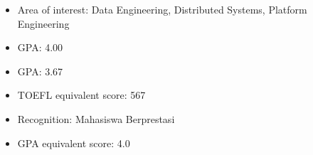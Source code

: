\begin{itemize}
  \item Area of interest: Data Engineering, Distributed Systems, Platform Engineering
  \item GPA: 4.00
\end{itemize}

\begin{itemize}
  \item GPA: 3.67
  \item TOEFL equivalent score: 567
  \item Recognition: Mahasiswa Berprestasi
\end{itemize}

\begin{itemize}
  \item GPA equivalent score: 4.0
\end{itemize}
